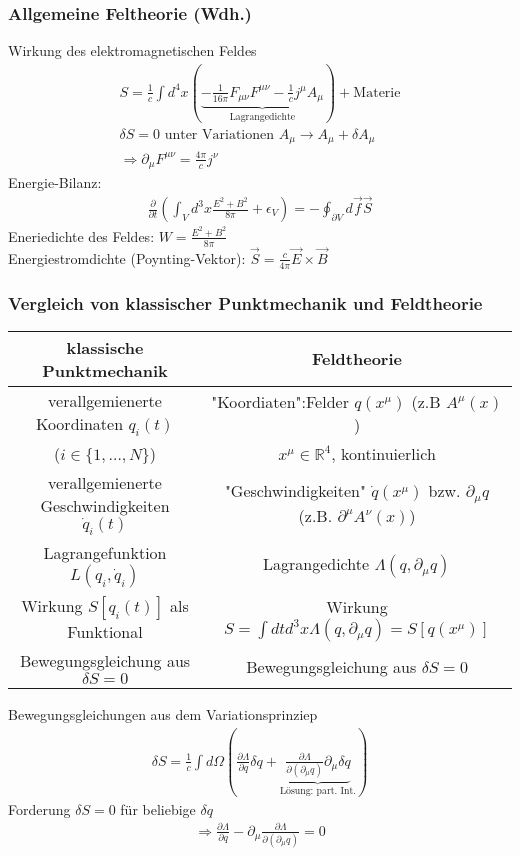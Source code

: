 \documentclass[a4paper]{article}
\begin{document}
\subsubsection{Allgemeine Feltheorie (Wdh.)}
Wirkung des elektromagnetischen Feldes 
\begin{align}
S=\frac{1}{c}\int d^4x\left(\underbrace{-\frac{1}{16\pi}F_{\mu\nu}F^{\mu\nu}-
\frac{1}{c}j^\mu A_\mu}_{\text{Lagrangedichte}} \right) +\text{Materie}\\
\delta S=0 \text{ unter Variationen } A_\mu \rightarrow A_\mu+\delta A_\mu\\
\Rightarrow \partial_\mu F^{\mu\nu}=\frac{4\pi}{c}j^\nu
\end{align}
Energie-Bilanz:
\begin{align}
\frac{\partial}{\partial t}\left(\int_V d^3x
\frac{E^2+B^2}{8\pi}+\epsilon_V\right)=-\oint_{\partial V} d\vec{f}\vec{S}
\end{align}
Eneriedichte des Feldes: $W=\frac{E^2+B^2}{8\pi}$\\
Energiestromdichte (Poynting-Vektor):
$\vec{S}=\frac{c}{4\pi}\vec{E}\times\vec{B}$
\subsubsection{Vergleich von klassischer Punktmechanik und Feldtheorie}

\begin{tabular}{c|c}
klassische Punktmechanik & Feldtheorie\\  
\hline\hline
verallgemienerte Koordinaten $q_i(t)$ &
"Koordiaten":Felder $q(x^\mu)$ (z.B $A^\mu(x)$)
\\
($i\in \{1,\ldots,N\}$)&$x^\mu \in \mathbb{R}^4$, kontinuierlich\\
verallgemienerte Geschwindigkeiten $\dot{q}_i(t)$&
"Geschwindigkeiten" $\dot{q}(x^\mu)$ bzw. $\partial_\mu q$ (z.B.
$\partial^\mu A^\nu(x)$)\\
Lagrangefunktion $L(q_i,\dot{q}_i)$ & Lagrangedichte $\Lambda(q,\partial_\mu
q)$\\
Wirkung $S[q_i(t)]$ als Funktional & Wirkung $S=\int dt d^3x
\Lambda(q,\partial_\mu q)=S[q(x^\mu)]$\\
Bewegungsgleichung aus $\delta S=0$&Bewegungsgleichung aus $\delta S=0$\\
\end{tabular}

Bewegungsgleichungen aus dem Variationsprinziep
\begin{align}
\delta S=\frac{1}{c}\int d\Omega \left( \frac{\partial
\Lambda}{\partial\!q}\delta\!q +\underbrace{\frac{\partial \Lambda}{\partial\!
(\partial_\mu\! q)} \partial_\mu\! \delta\!q}_{\text{Lösung: part. Int.}}
\right)
\end{align}
Forderung $\delta S=0$ für beliebige $\delta q$
\begin{align}
\Rightarrow  \frac{\partial
\Lambda}{\partial\!q} -\partial_\mu \frac{\partial \Lambda}{\partial\!
(\partial_\mu\! q)}=0
\end{align}
\end{document}
